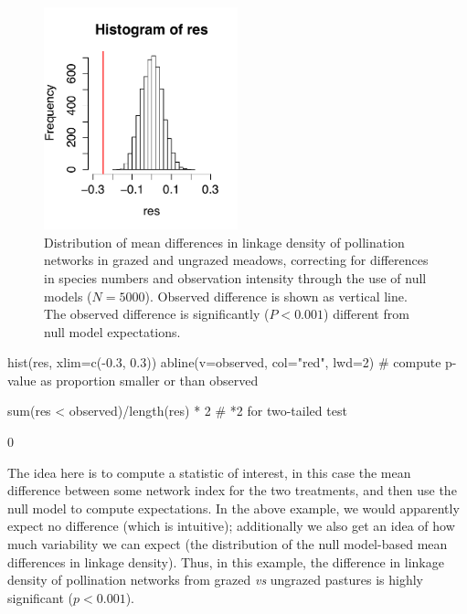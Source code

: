 \documentclass[a4paper, 11pt]{article}\usepackage[]{graphicx}\usepackage[]{color}
\begin{document}
\begin{figure}
\centering
\includegraphics[width=0.5\textwidth]{figures/cattle_nullmodelled}
\caption{Distribution of mean differences in linkage density of pollination networks in grazed and ungrazed meadows, correcting for differences in species numbers and observation intensity through the use of null models ($N=5000$). Observed difference is shown as vertical line. The observed difference is significantly ($P<0.001$) different from null model expectations.}
\label{fig:cattlenull}
\end{figure}
%
\begin{Schunk}
\begin{Sinput}
hist(res, xlim=c(-0.3, 0.3))
abline(v=observed, col="red", lwd=2)
# compute p-value as proportion smaller or than observed
\end{Sinput}
\end{Schunk}
\begin{Schunk}
\begin{Sinput}
sum(res < observed)/length(res) * 2 # *2 for two-tailed test
\end{Sinput}
\begin{Soutput}
[1] 0
\end{Soutput}
\end{Schunk}
The idea here is to compute a statistic of interest, in this case the mean difference between some network index for the two treatments, and then use the null model to compute expectations. In the above example, we would apparently expect no difference (which is intuitive); additionally we also get an idea of how much variability we can expect (the distribution of the null model-based mean differences in linkage density). Thus, in this example, the difference in linkage density of pollination networks from grazed \emph{vs} ungrazed pastures is highly significant ($p<0.001$).
\end{document}
